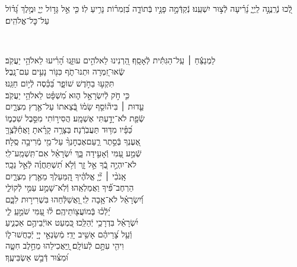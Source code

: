 \documentclass[twoside, openany, parskip=half, 11pt]{book}
\begin{document}
{\begin{narrow}
לְֿ֭כוּ נְֿרַֽנֲנָ֣ה לַֽיְיָ֑ נָ֝רִ֗יעָה לְֿצ֣וּר יִשְׁעֵֽנוּ׃ נְֿקַדְּֿמָ֣ה פָנָ֣יו בְּֿתוֹדָ֑ה בִּ֝זְמִר֗וֹת נָרִ֥יעַ לֽוֹ׃ כִּ֤י אֵ֣ל גָּד֣וֹל יְיָ֑ וּמֶ֥לֶךְ גָּ֝ד֗וֹל עַל־כׇּל־אֱלֹהִֽים׃
\end{narrow}

\\
\vspace{-1.5\baselineskip}
\begin{narrow}
%
לַמְנַצֵּ֬חַ ׀ עַֽל־הַגִּתִּ֬ית לְֿאָסָֽף׃ \hfill \break
הַ֭רְנִינוּ לֵאלֹהִ֣ים עוּזֵּ֑נוּ \hfill הָ֝רִ֗יעוּ לֵאלֹהֵ֥י יַעֲקֹֽב׃ \\
שְֽֿׂאוּ־זִ֭מְרָה וּתְנוּ־תֹ֑ף \hfill כִּנּ֖וֹר נָעִ֣ים עִם־נָֽבֶל׃ \\
תִּקְע֣וּ בַחֹ֣דֶשׁ שׁוֹפָ֑ר \hfill בַּ֝כֵּ֗סֶה לְֿי֣וֹם חַגֵּֽנוּ׃ \\
כִּ֤י חֹ֣ק לְֿיִשְׂרָאֵ֣ל ה֑וּא \hfill מִ֝שְׁפָּ֗ט לֵאלֹהֵ֥י יַעֲקֹֽב׃ \\
עֵ֤דוּת ׀ בִּיה֘וֹסֵ֤ף שָׂמ֗וֹ \hfill בְּֿ֭צֵאתוֹ עַל־אֶ֣רֶץ מִצְרָ֑יִם \\ שְֿׂפַ֖ת לֹא־יָדַ֣עְתִּי אֶשְׁמָֽע׃ \hfill
הֲסִיר֣וֹתִי מִסֵּ֣בֶל שִׁכְמ֑וֹ \\ כַּ֝פָּ֗יו מִדּ֥וּד תַּעֲבֹֽרְֿנָה׃ \hfill
בַּצָּרָ֥ה קָרָ֗אתָ וָאֲחַ֫לְּֿצֶ֥ךָּ \\ אֶ֭עֶנְךָ בְּֿסֵ֣תֶר רַ֑עַם\hfill אֶבְחׇנְךָ֨ עַל־מֵ֖י מְֿרִיבָ֣ה סֶֽלָה׃ \\
שְֿׁמַ֣ע עַ֭מִּי וְֿאָעִ֣ידָה בָּ֑ךְ \hfill יִ֝שְׂרָאֵ֗ל אִם־תִּֽשְׁמַֽע־לִֽי׃ \\
לֹא־יִהְיֶ֣ה בְֿ֭ךָ אֵ֣ל זָ֑ר \hfill וְֿלֹ֥א תִ֝שְׁתַּחֲוֶ֗ה לְֿאֵ֣ל נֵכָֽר׃ \\
אָֽנֹכִ֨י ׀ יְ֘יָ֤ אֱלֹהֶ֗יךָ \hfill הַֽ֭מַּעַלְךָ מֵאֶ֣רֶץ מִצְרָ֑יִם \\ הַרְחֶב־פִּ֗֝יךָ וַאֲמַלְאֵֽהוּ׃ \hfill
וְֿלֹֽא־שָׁמַ֣ע עַמִּ֣י לְֿקוֹלִ֑י \\ וְֿ֝יִשְׂרָאֵ֗ל לֹא־אָ֥בָה לִֽי׃ \hfill
וָ֭אֲשַׁלְּֿחֵהוּ בִּשְׁרִיר֣וּת לִבָּ֑ם \\ יֵ֝לְֿכ֗וּ בְּֽֿמוֹעֲצ֖וֹתֵיהֶֽם׃ \hfill
ל֗וּ עַ֭מִּי שֹׁמֵ֣עַֽ לִ֑י \\ יִ֝שְׂרָאֵ֗ל בִּדְרָכַ֥י יְֿהַלֵּֽכוּ׃ \hfill
כִּ֭מְעַט אוֹיְֿבֵיהֶ֣ם אַכְנִ֑יעַ \\ וְֿעַ֥ל צָ֝רֵיהֶ֗ם אָשִׁ֥יב יָדִֽי׃ \hfill
מְֿשַׂנְאֵ֣י יְיָ֭ יְֿכַחֲשׁוּ־ל֑וֹ \\ וִיהִ֖י עִתָּ֣ם לְֿעוֹלָֽם׃ \hfill
וַֽ֭יַּאֲכִילֵהוּ מֵחֵ֣לֶב חִטָּ֑ה \\ וּ֝מִצּ֗וּר דְּֿבַ֣שׁ אַשְׂבִּיעֶֽךָ׃ \hfill \break
\end{narrow}

}
\end{document}
